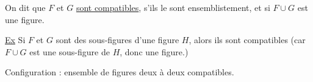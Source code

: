 On dit que $F$ et $G$ \uline{sont compatibles},  s'ils le sont ensemblistement, et si $F\cup G$ est une figure. 

\uline{Ex} Si $F$ et $G$ sont des sous-figures d'une figure $H$, alors ils sont compatibles (car  $F\cup G$ est une sous-figure de $H$, donc une figure.)

Configuration : ensemble de figures deux à deux compatibles.
